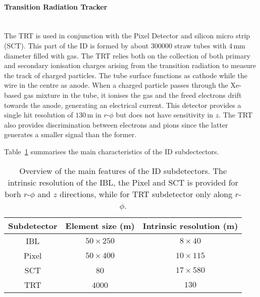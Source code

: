 \paragraph{Transition Radiation Tracker}\mbox{}\\
\label{sec:Chap2:ID:TRT}
The TRT is used in conjunction with the Pixel Detector and silicon micro strip (SCT). %
This part of the ID 
is formed by about 300000  straw tubes with  $4\,$mm diameter filled with gas.
 The TRT relies both on the collection of both primary and secondary ionisation charges arising 
 from the transition radiation to measure the  track of charged particles. 
 The tube surface functions as cathode while the wire in the centre as anode. When a charged particle passes through the Xe-based gas mixture in 
 the tube, it ionises the gas and the freed electrons drift towards the anode, generating an electrical current. This detector provides 
 a single hit resolution of $130\,$\textmu m in $r$-$\phi$ but does not have sensitivity in $z$.
The TRT also provides discrimination between electrons and pions since the latter generates a smaller signal than the former. 

Table~\ref{tab:Chap2:ID:Detalils} summarises the main characteristics of the 
ID subdectectors. 

\begin{table}[h!]
\centering
\begin{tabular}{c c c }
\toprule
Subdetector 	& Element size (\textmu m) 	& Intrinsic resolution (\textmu m) 	\\ \midrule
IBL 			&   $50 \times 250$		&   $8 \times 40$			\\
Pixel 		&   $50 \times 400$		&   $10 \times 115$			\\
SCT 			&   	    80				&   $17 \times 580$			\\
TRT 			& 	  4000			&   $130$					\\ \bottomrule 
\end{tabular}
\caption{Overview of the main features of the ID subdetectors. The intrinsic resolution of the 
IBL, the Pixel and SCT is provided for borh $r$-$\phi$ and $z$ directions, while for TRT subdetector
only along $r$-$\phi$.}
\label{tab:Chap2:ID:Detalils}
\end{table}



